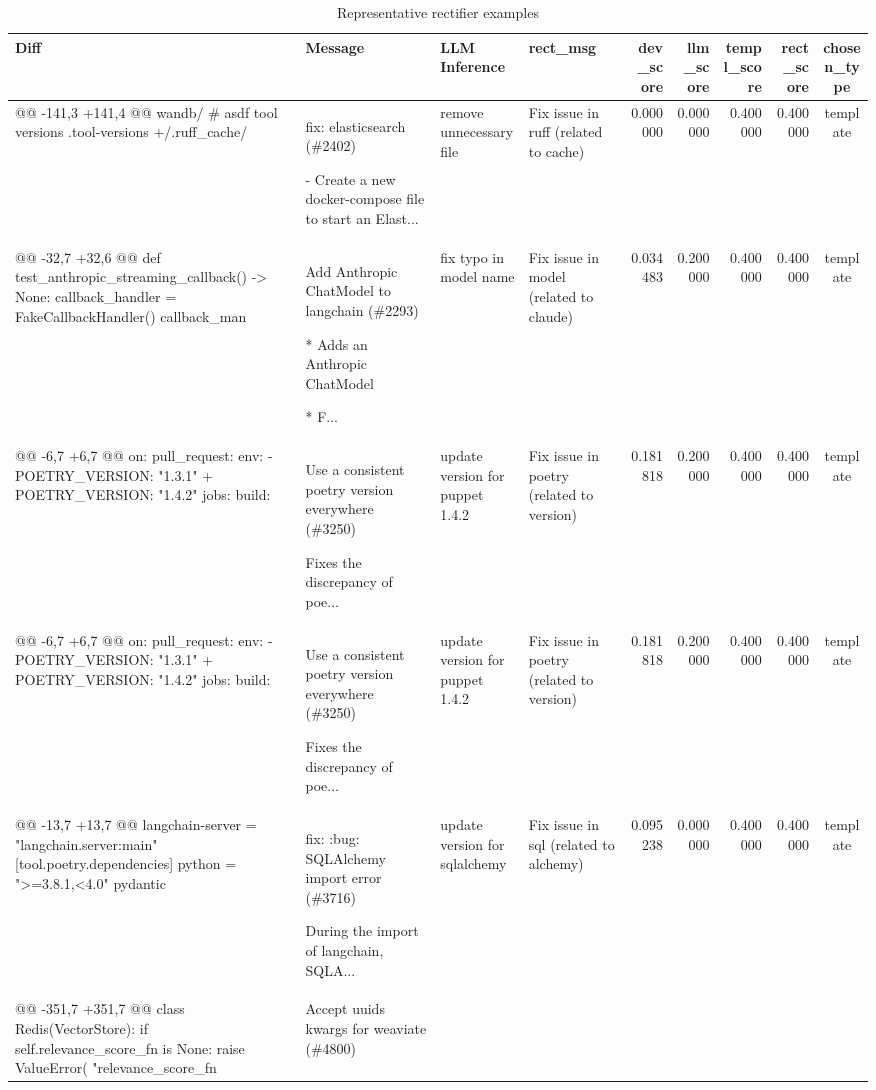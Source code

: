 \begin{table}
\caption{Representative rectifier examples}
\label{tab:examples}
\begin{tabular}{p{3cm}p{2.2cm}p{2.2cm}p{2.2cm}rrrrc}
\toprule
Diff & Message & LLM Inference & rect\_msg & dev\_score & llm\_score & templ\_score & rect\_score & chosen\_type \\
\midrule
@@ -141,3 +141,4 @@ wandb/ \# asdf tool versions .tool-versions +/.ruff\_cache/  & fix: elasticsearch (\#2402)

- Create a new docker-compose file to start an Elast... & remove unnecessary file & Fix issue in ruff (related to cache) & 0.000000 & 0.000000 & 0.400000 & 0.400000 & template \\
@@ -32,7 +32,6 @@ def test\_anthropic\_streaming\_callback() -> None: callback\_handler = FakeCallbackHandler() callback\_man & Add Anthropic ChatModel to langchain (\#2293)

* Adds an Anthropic ChatModel

* F... & fix typo in model name & Fix issue in model (related to claude) & 0.034483 & 0.200000 & 0.400000 & 0.400000 & template \\
@@ -6,7 +6,7 @@ on: pull\_request: env: - POETRY\_VERSION: "1.3.1" + POETRY\_VERSION: "1.4.2" jobs: build:  & Use a consistent poetry version everywhere (\#3250)

Fixes the discrepancy of poe... & update version for puppet 1.4.2 & Fix issue in poetry (related to version) & 0.181818 & 0.200000 & 0.400000 & 0.400000 & template \\
@@ -6,7 +6,7 @@ on: pull\_request: env: - POETRY\_VERSION: "1.3.1" + POETRY\_VERSION: "1.4.2" jobs: build:  & Use a consistent poetry version everywhere (\#3250)

Fixes the discrepancy of poe... & update version for puppet 1.4.2 & Fix issue in poetry (related to version) & 0.181818 & 0.200000 & 0.400000 & 0.400000 & template \\
@@ -13,7 +13,7 @@ langchain-server = "langchain.server:main" [tool.poetry.dependencies] python = ">=3.8.1,<4.0" pydantic & fix: :bug: SQLAlchemy import error (\#3716)

During the import of langchain, SQLA... & update version for sqlalchemy & Fix issue in sql (related to alchemy) & 0.095238 & 0.000000 & 0.400000 & 0.400000 & template \\
@@ -351,7 +351,7 @@ class Redis(VectorStore): if self.relevance\_score\_fn is None: raise ValueError( "relevance\_score\_fn  & Accept uuids kwargs for weaviate (\#4800)


\end{tabular}
\end{table}
